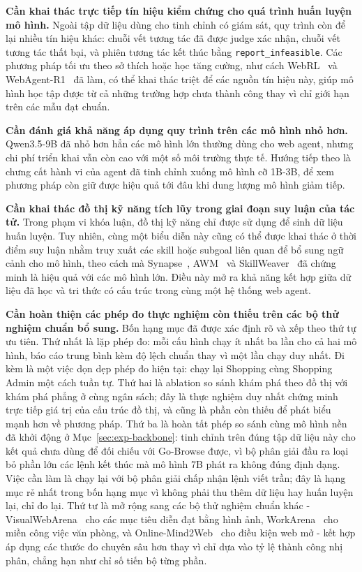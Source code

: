 \textbf{Cần khai thác trực tiếp tín hiệu kiểm chứng cho quá trình huấn luyện mô hình.}
Ngoài tập dữ liệu dùng cho tinh chỉnh có giám sát, quy trình còn để lại nhiều
tín hiệu khác: chuỗi vết tương tác đã được judge xác nhận, chuỗi vết tương tác thất bại, và phiên tương tác
kết thúc bằng \texttt{report\_infeasible}. Các phương pháp tối ưu theo sở thích hoặc học tăng cường, như cách WebRL~\cite{qi2025webrl} và WebAgent-R1~\cite{wei2025webagentr1} đã làm, có thể khai thác triệt để các nguồn tín hiệu này, giúp mô hình học tập được từ cả những trường hợp chưa thành công thay vì chỉ giới hạn trên các mẫu đạt chuẩn.

\textbf{Cần đánh giá khả năng áp dụng quy trình trên các mô hình nhỏ hơn.}
Qwen3.5-9B đã nhỏ hơn hẳn các mô hình lớn thường dùng cho web agent,
nhưng chi phí triển khai vẫn còn cao với một số môi trường thực tế. Hướng tiếp
theo là chưng cất hành vi của agent đã tinh chỉnh xuống mô hình cỡ 1B-3B,
để xem phương pháp còn giữ được hiệu quả tới đâu khi dung lượng mô hình giảm
tiếp.

\textbf{Cần khai thác đồ thị kỹ năng tích lũy trong giai đoạn suy luận của tác tử.}
Trong phạm vi khóa luận, đồ thị kỹ năng chỉ được sử dụng để sinh dữ liệu huấn
luyện. Tuy nhiên, cùng một biểu diễn này cũng có thể được khai thác ở thời
điểm suy luận nhằm truy xuất các skill hoặc subgoal liên quan để bổ sung ngữ
cảnh cho mô hình, theo cách mà Synapse~\cite{zheng2024synapse}, AWM~\cite{wang2024awm} và SkillWeaver~\cite{zheng2025skillweaver} đã chứng minh là hiệu quả với các mô hình lớn. Điều này mở ra khả năng kết hợp giữa dữ liệu đã học và tri
thức có cấu trúc trong cùng một hệ thống web agent.

\textbf{Cần hoàn thiện các phép đo thực nghiệm còn thiếu trên các bộ thử nghiệm chuẩn bổ sung.}
Bốn hạng mục đã được xác định rõ và xếp theo thứ tự ưu tiên. Thứ nhất là lặp
phép đo: mỗi cấu hình chạy ít nhất ba lần cho cả hai mô hình, báo cáo trung
bình kèm độ lệch chuẩn thay vì một lần chạy duy nhất. Đi kèm là một việc dọn
dẹp phép đo hiện tại: chạy lại Shopping cùng Shopping Admin một cách tuần tự.
Thứ hai là ablation so sánh khám phá theo đồ thị với khám phá phẳng ở cùng
ngân sách; đây là thực nghiệm duy nhất chứng minh trực tiếp giá trị của cấu
trúc đồ thị, và cũng là phần còn thiếu để phát biểu mạnh hơn về phương pháp.
Thứ ba là hoàn tất phép so sánh cùng mô hình nền đã khởi động ở
Mục~\ref{sec:exp-backbone}: tinh chỉnh trên đúng tập dữ liệu này cho kết quả
chưa dùng để đối chiếu với Go-Browse được, vì bộ phân giải đầu ra loại bỏ phần
lớn các lệnh kết thúc mà mô hình 7B phát ra không đúng định dạng. Việc cần làm
là chạy lại với bộ phân giải chấp nhận lệnh viết trần; đây là hạng mục rẻ nhất
trong bốn hạng mục vì không phải thu thêm dữ liệu hay huấn luyện lại, chỉ đo
lại. Thứ tư là mở rộng sang các bộ thử nghiệm chuẩn khác - VisualWebArena~\cite{koh2024visualwebarena} cho các mục tiêu diễn đạt bằng hình ảnh, WorkArena~\cite{drouin2024workarena} cho miền công việc văn phòng, và Online-Mind2Web~\cite{xue2025illusion} cho điều kiện web mở - kết hợp áp dụng các thước đo chuyên sâu hơn thay vì chỉ dựa vào tỷ lệ thành công nhị phân, chẳng hạn như chỉ số tiến bộ từng phần.

